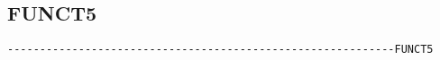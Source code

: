 

\subsection{FUNCT5}
\begin{verbatim}
------------------------------------------------------------FUNCT5
\end{verbatim}

